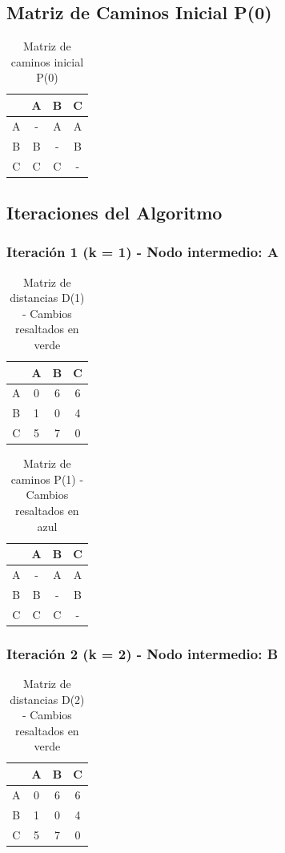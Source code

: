 \documentclass[12pt]{article}
\begin{document}
\clearpage
\subsection{Matriz de Caminos Inicial P(0)}
\begin{table}[h!]
\centering
\begin{tabular}{|c|c|c|c|}
\hline
 & A & B & C \\\hline
A & - & A & A \\\hline
B & B & - & B \\\hline
C & C & C & - \\\hline
\end{tabular}
\caption{Matriz de caminos inicial P(0)}
\end{table}

\subsection{Iteraciones del Algoritmo}
\clearpage
\subsubsection{Iteración 1 (k = 1) - Nodo intermedio: A}
\begin{table}[h!]
\centering
\begin{tabular}{|c|c|c|c|}
\hline
 & A & B & C \\\hline
A & 0 & 6 & 6 \\\hline
B & 1 & 0 & 4 \\\hline
C & 5 & 7 & 0 \\\hline
\end{tabular}
\caption{Matriz de distancias D(1) - Cambios resaltados en verde}
\end{table}

\begin{table}[h!]
\centering
\begin{tabular}{|c|c|c|c|}
\hline
 & A & B & C \\\hline
A & - & A & A \\\hline
B & B & - & B \\\hline
C & C & C & - \\\hline
\end{tabular}
\caption{Matriz de caminos P(1) - Cambios resaltados en azul}
\end{table}

\clearpage
\subsubsection{Iteración 2 (k = 2) - Nodo intermedio: B}
\begin{table}[h!]
\centering
\begin{tabular}{|c|c|c|c|}
\hline
 & A & B & C \\\hline
A & 0 & 6 & 6 \\\hline
B & 1 & 0 & 4 \\\hline
C & 5 & 7 & 0 \\\hline
\end{tabular}
\caption{Matriz de distancias D(2) - Cambios resaltados en verde}
\end{table}
\end{document}
